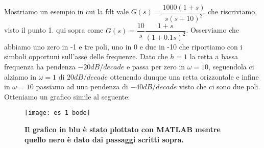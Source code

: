 \documentclass[a4paper]{article}
\begin{document}
	Mostriamo un esempio in cui la fdt vale $G(s)=\dfrac{1000(1+s)}{s(s+10)^2}$ che riscriviamo, visto il punto 1. qui sopra come $G(s)=\dfrac{10}{s}\dfrac{1+s}{(1+0.1s)^2}$. Osserviamo che abbiamo uno zero in -1 e tre poli, uno in 0 e due in -10 che riportiamo con i simboli opportuni sull'asse delle frequenze. Dato che $h=1$ la retta a bassa frequenza ha pendenza $-20dB/decade$ e passa per zero in $\omega=10$, seguendola ci alziamo in $\omega=1$ di $20dB/decade$ ottenendo dunque una retta orizzontale e infine in $\omega=10$ passiamo ad una pendenza di $-40dB/decade$ visto che ci sono due poli. Otteniamo un grafico simile al seguente:
	 	\begin{figure}[H]
	 	\centering
	 	\texttt{[image: es 1 bode]}
	 	\caption{\textbf{Il grafico in blu è stato plottato con MATLAB mentre quello nero è dato dai passaggi scritti sopra.}}
	 \end{figure}
	
\end{document}
